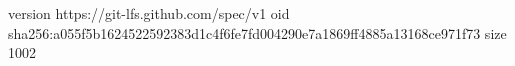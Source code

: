 version https://git-lfs.github.com/spec/v1
oid sha256:a055f5b1624522592383d1c4f6fe7fd004290e7a1869ff4885a13168ce971f73
size 1002
